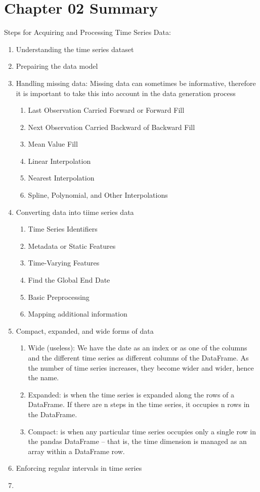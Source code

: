 \documentclass{article}
\begin{document}
\section{Chapter 02 Summary}
Steps for Acquiring and Processing Time Series Data:
\begin{enumerate}
    \item Understanding the time series dataset
    \item Prepairing the data model
    \item Handling missing data: Missing data can sometimes be informative, therefore it is important to take this into account in the data generation process
    \begin{enumerate}
        \item Last Observation Carried Forward or Forward Fill
        \item Next Observation Carried Backward of Backward Fill
        \item Mean Value Fill
        \item Linear Interpolation
        \item Nearest Interpolation
        \item Spline, Polynomial, and Other Interpolations
    \end{enumerate}
    \item Converting data into tiime series data
    \begin{enumerate}
        \item Time Series Identifiers
        \item Metadata or Static Features
        \item Time-Varying Features
        \item Find the Global End Date
        \item Basic Preprocessing
        \item Mapping additional information
    \end{enumerate}
    \item Compact, expanded, and wide forms of data
    \begin{enumerate}
        \item Wide (useless): We have the date as an index or as one of the columns and the different time series as different columns
        of the DataFrame. As the number of time series increases, they become wider and wider, hence the
        name.
        \item Expanded: is when the time series is expanded along the rows of a DataFrame. If there are
        n steps in the time series, it occupies n rows in the DataFrame.
        \item Compact: is when any particular time series occupies only a single row in the pandas
        DataFrame – that is, the time dimension is managed as an array within a DataFrame row.
    \end{enumerate}
    \item Enforcing regular intervals in time series
    \item 
\end{enumerate}
\end{document}
